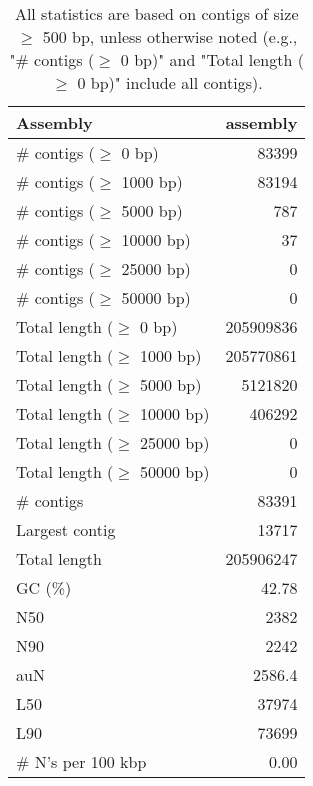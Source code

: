 \documentclass[12pt,a4paper]{article}
\begin{document}
\begin{table}[ht]
\begin{center}
\caption{All statistics are based on contigs of size $\geq$ 500 bp, unless otherwise noted (e.g., "\# contigs ($\geq$ 0 bp)" and "Total length ($\geq$ 0 bp)" include all contigs).}
\begin{tabular}{|l*{1}{|r}|}
\hline
Assembly & assembly \\ \hline
\# contigs ($\geq$ 0 bp) & 83399 \\ \hline
\# contigs ($\geq$ 1000 bp) & 83194 \\ \hline
\# contigs ($\geq$ 5000 bp) & 787 \\ \hline
\# contigs ($\geq$ 10000 bp) & 37 \\ \hline
\# contigs ($\geq$ 25000 bp) & 0 \\ \hline
\# contigs ($\geq$ 50000 bp) & 0 \\ \hline
Total length ($\geq$ 0 bp) & 205909836 \\ \hline
Total length ($\geq$ 1000 bp) & 205770861 \\ \hline
Total length ($\geq$ 5000 bp) & 5121820 \\ \hline
Total length ($\geq$ 10000 bp) & 406292 \\ \hline
Total length ($\geq$ 25000 bp) & 0 \\ \hline
Total length ($\geq$ 50000 bp) & 0 \\ \hline
\# contigs & 83391 \\ \hline
Largest contig & 13717 \\ \hline
Total length & 205906247 \\ \hline
GC (\%) & 42.78 \\ \hline
N50 & 2382 \\ \hline
N90 & 2242 \\ \hline
auN & 2586.4 \\ \hline
L50 & 37974 \\ \hline
L90 & 73699 \\ \hline
\# N's per 100 kbp & 0.00 \\ \hline
\end{tabular}
\end{center}
\end{table}
\end{document}
